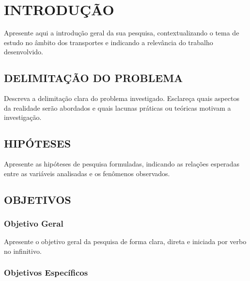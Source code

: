 \chapter{INTRODUÇÃO}
\label{introducao}
\label{capitulo1}


Apresente aqui a introdução geral da sua pesquisa, contextualizando o tema de estudo no âmbito dos transportes e indicando a relevância do trabalho desenvolvido.

\section{DELIMITAÇÃO DO PROBLEMA}
\label{sec:problema}

Descreva a delimitação clara do problema investigado. Esclareça quais aspectos da realidade serão abordados e quais lacunas práticas ou teóricas motivam a investigação.

\section{HIPÓTESES}
\label{sec:hipoteses}

Apresente as hipóteses de pesquisa formuladas, indicando as relações esperadas entre as variáveis analisadas e os fenômenos observados.

\section{OBJETIVOS}
\label{sec:objetivos}

\subsection{Objetivo Geral}

Apresente o objetivo geral da pesquisa de forma clara, direta e iniciada por verbo no infinitivo.

\subsection{Objetivos Específicos}

